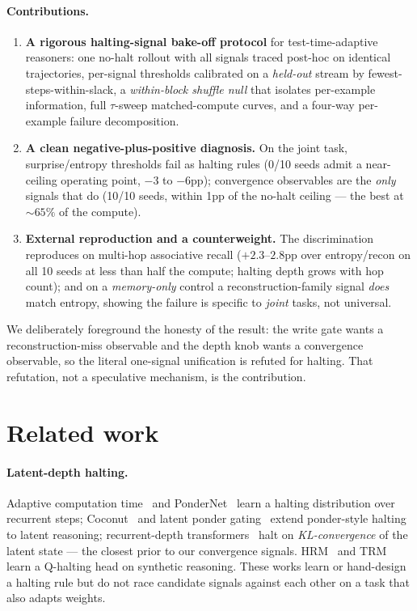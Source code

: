 \documentclass{article}
\begin{document}
\paragraph{Contributions.}
\begin{enumerate}
  \item \textbf{A rigorous halting-signal bake-off protocol} for
  test-time-adaptive reasoners: one no-halt rollout with all signals traced
  post-hoc on identical trajectories, per-signal thresholds calibrated on a
  \emph{held-out} stream by fewest-steps-within-slack, a \emph{within-block
  shuffle null} that isolates per-example information, full $\tau$-sweep
  matched-compute curves, and a four-way per-example failure decomposition.
  \item \textbf{A clean negative-plus-positive diagnosis.} On the joint task,
  surprise/entropy thresholds fail as halting rules (0/10 seeds admit a
  near-ceiling operating point, $-3$ to $-6$pp); convergence observables are
  the \emph{only} signals that do (10/10 seeds, within 1pp of the no-halt
  ceiling --- the best at ${\sim}65\%$ of the compute).
  \item \textbf{External reproduction and a counterweight.} The discrimination
  reproduces on multi-hop associative recall ($+2.3$--$2.8$pp over
  entropy/recon on all 10 seeds at less than half the compute; halting depth
  grows with hop count); and on a \emph{memory-only} control a
  reconstruction-family signal \emph{does} match entropy, showing the failure
  is specific to \emph{joint} tasks, not universal.
\end{enumerate}

We deliberately foreground the honesty of the result: the write gate wants a
reconstruction-miss observable and the depth knob wants a convergence
observable, so the literal one-signal unification is refuted for halting. That
refutation, not a speculative mechanism, is the contribution.

\section{Related work}

\paragraph{Latent-depth halting.} Adaptive computation
time~\citep{graves2016act} and PonderNet~\citep{banino2021pondernet} learn a
halting distribution over recurrent steps; Coconut~\citep{hao2024coconut} and
latent ponder gating~\citep{frponder2025} extend ponder-style halting to latent
reasoning;
recurrent-depth transformers~\citep{geiping2025recurrent} halt on
\emph{KL-convergence} of the latent state --- the closest prior to our
convergence signals. HRM~\citep{wang2025hrm} and TRM~\citep{jolicoeur2025trm}
learn a Q-halting head on synthetic reasoning. These works learn or hand-design
a halting rule but do not race candidate signals against each other on a task
that also adapts weights.
\end{document}
